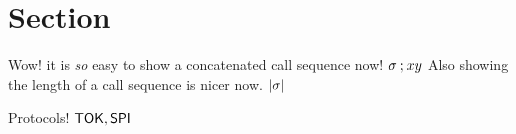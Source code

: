 \section{Section}\label{sec:example}
Wow! it is \textit{so} easy to show a concatenated call sequence now! \( \sigma \conc xy \)
Also showing the length of a call sequence is nicer now. \( \length{\sigma} \)

Protocols! \(\P{TOK}, \P{SPI}\)